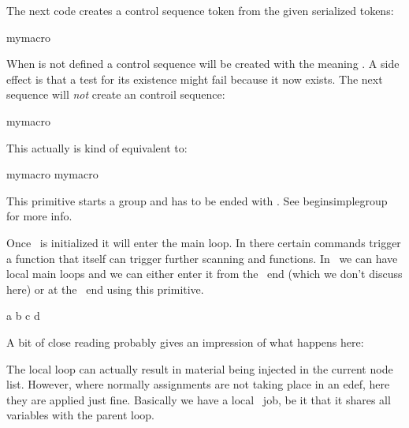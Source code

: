 The next code creates a control sequence token from the given serialized tokens:

\starttyping
\csname mymacro\endcsname
\stoptyping

When \type {\mymacro} is not defined a control sequence will be created with the
meaning . A side effect is that a test for its existence might fail
because it now exists. The next sequence will {\em not} create an controil
sequence:

\starttyping
\begincsname mymacro\endcsname
\stoptyping

This actually is kind of equivalent to:

\starttyping
\ifcsname mymacro\endcsname
    \csname mymacro\endcsname
\fi
\stoptyping

\stopnewprimitive

\startoldprimitive[title={\prm {begingroup}}]

This primitive starts a group and has to be ended with . See \prm
{beginsimplegroup} for more info.

\stopoldprimitive

\startnewprimitive[title={\prm {beginlocalcontrol}}]

Once \TEX\ is initialized it will enter the main loop. In there certain commands
trigger a function that itself can trigger further scanning and functions. In
\LUAMETATEX\ we can have local main loops and we can either enter it from the
\LUA\ end (which we don't discuss here) or at the \TEX\ end using this primitive.

\startbuffer
{}

\edef\whatever{
    a
    \beginlocalcontrol
        \advance\scratchcounter 10
        b
    \endlocalcontrol
    \beginlocalcontrol
        c
    \endlocalcontrol
    d
    \advance{}
}

\the\scratchcounter
\whatever
\the\scratchcounter
\stopbuffer

\typebuffer

A bit of close reading probably gives an impression of what happens here:

{\getbuffer}

The local loop can actually result in material being injected in the current node
list. However, where normally assignments are not taking place in an \prm
{edef}, here they are applied just fine. Basically we have a local \TEX\ job, be
it that it shares all variables with the parent loop.

\stopnewprimitive

